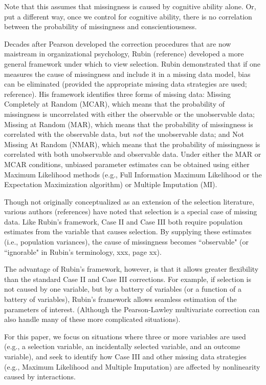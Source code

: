 \documentclass[man, babel,english]{apa}%
\begin{document}
Note that this assumes that missingness is caused by cognitive ability alone. Or, put a different way, once we control for cognitive ability, there is no correlation between the probability of missingness and conscientiousness. 

Decades after Pearson developed the correction procedures that are now maistream in organizational psychology, Rubin (reference) developed a more general framework under which to view selection. Rubin demonstrated that if one measures the cause of missingness and include it in a missing data model, bias can be eliminated (provided the appropriate missing data strategies are used; reference). His framework identifies three forms of missing data: Missing Completely at Random (MCAR), which means that the probability of missingness is uncorrelated with either the observable or the unobservable data; Missing at Random (MAR), which means that the probability of missingness is correlated with the observable data, but \emph{not} the unobservable data; and Not Missing At Random (NMAR), which means that the probability of missingness is correlated with both unobservable and observable data. Under either the MAR or MCAR conditions, unbiased parameter estimates can be obtained using either Maximum Likelihood methods (e.g., Full Information Maximum Likelihood or the Expectation Maximization algorithm) or Multiple Imputation (MI). 

Though not originally conceptualized as an extension of the selection literature, various authors (references) have noted that selection is a special case of missing data. Like Rubin's framework, Case II and Case III both require population estimates from the variable that causes selection. By supplying these estimates (i.e., population variances), the cause of missingness becomes ``observable" (or ``ignorable" in Rubin's terminology, xxx, page xx).

The advantage of Rubin's framework, however, is that it allows greater flexibility than the standard Case II and Case III corrections. For example, if selection is not caused by one variable, but by a battery of variables (or a function of a battery of variables), Rubin's framework allows seamless estimation of the parameters of interest. (Although the Pearson-Lawley multivariate correction can also handle many of these more complicated situations). 

For this paper, we focus on situations where three or more variables are used (e.g., a selection variable, an incidentally selected variable, and an outcome variable), and seek to identify how Case III and other missing data strategies (e.g., Maximum Likelihood and Multiple Imputation) are affected by nonlinearity caused by interactions. 
\end{document}
